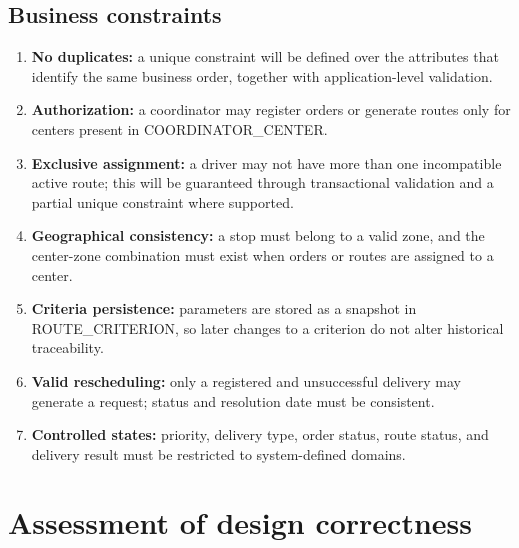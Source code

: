 \documentclass[12pt,a4paper]{article}
\begin{document}
\subsection{Business constraints}
\begin{enumerate}
\item \textbf{No duplicates:} a unique constraint will be defined over the attributes that identify the same business order, together with application-level validation.
\item \textbf{Authorization:} a coordinator may register orders or generate routes only for centers present in COORDINATOR\_CENTER.
\item \textbf{Exclusive assignment:} a driver may not have more than one incompatible active route; this will be guaranteed through transactional validation and a partial unique constraint where supported.
\item \textbf{Geographical consistency:} a stop must belong to a valid zone, and the center-zone combination must exist when orders or routes are assigned to a center.
\item \textbf{Criteria persistence:} parameters are stored as a snapshot in ROUTE\_CRITERION, so later changes to a criterion do not alter historical traceability.
\item \textbf{Valid rescheduling:} only a registered and unsuccessful delivery may generate a request; status and resolution date must be consistent.
\item \textbf{Controlled states:} priority, delivery type, order status, route status, and delivery result must be restricted to system-defined domains.
\end{enumerate}

\section{Assessment of design correctness}
\end{document}
